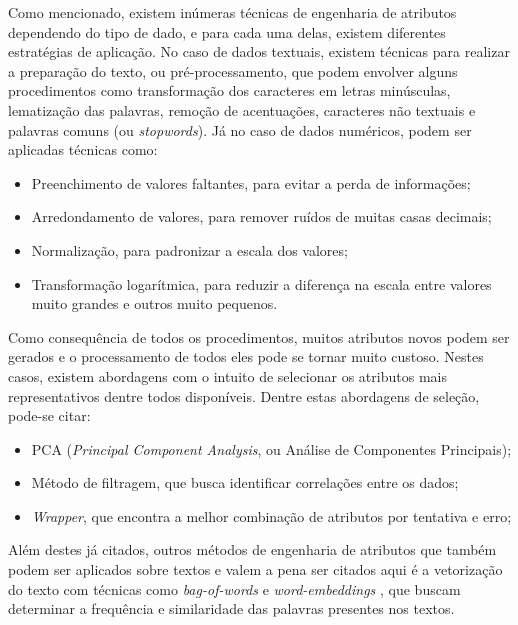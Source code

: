 \documentclass[oneside,openright,12pt]{ufsm_2015} %
\begin{document}
    \par Como mencionado, existem inúmeras técnicas de engenharia de atributos dependendo do tipo de dado, e para cada uma delas, existem diferentes estratégias de aplicação. No caso de dados textuais, existem técnicas para realizar a preparação do texto, ou pré-processamento, que podem envolver alguns procedimentos como transformação dos caracteres em letras minúsculas, lematização das palavras, remoção de acentuações, caracteres não textuais e palavras comuns (ou \textit{stopwords}). Já no caso de dados numéricos, podem ser aplicadas técnicas como:
    
    \begin{itemize}
        \item Preenchimento de valores faltantes, para evitar a perda de informações;
        \item Arredondamento de valores, para remover ruídos de muitas casas decimais;
        \item Normalização, para padronizar a escala dos valores;
        \item Transformação logarítmica, para reduzir a diferença na escala entre valores muito grandes e outros muito pequenos.
    \end{itemize}
    
    \par Como consequência de todos os procedimentos, muitos atributos novos podem ser gerados e o processamento de todos eles pode se tornar muito custoso. Nestes casos, existem abordagens com o intuito de selecionar os atributos mais representativos dentre todos disponíveis. Dentre estas abordagens de seleção, pode-se citar:
    \begin{itemize}
        \item PCA (\textit{Principal Component Analysis}, ou Análise de Componentes Principais);
        \item Método de filtragem, que busca identificar correlações entre os dados;
        \item \textit{Wrapper}, que encontra a melhor combinação de atributos por tentativa e erro;
    \end{itemize}
    
    \par Além destes já citados, outros métodos de engenharia de atributos que também podem ser aplicados sobre textos e valem a pena ser citados aqui é a vetorização do texto com técnicas como \textit{bag-of-words} \cite{mikolov:2013:2} e \textit{word-embeddings} \cite{mikolov:2013:1}, que buscam determinar a frequência e similaridade das palavras presentes nos textos.
\end{document}

